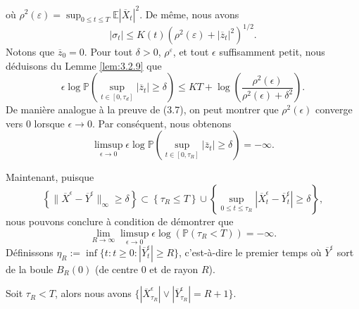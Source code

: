 \documentclass[12pt,a4paper,twoside]{report}%
\theoremstyle{definition}
\numberwithin{equation}{section}
\begin{document}
où \(\rho^{2}(\varepsilon) = \sup_{0 \leq t \leq T} \mathbb{E}|\overline{X}_t|^2\). De même, nous avons
\[
|\sigma_t| \leq K(t) \left( \rho^2(\varepsilon) + |\overline{z}_t|^2 \right)^{1/2}.
\] 	
Notons que \(\overline{z}_0 = 0\). Pour tout \(\delta > 0\), \(\rho^\varepsilon\), et tout \(\epsilon\) suffisamment petit, nous déduisons du Lemme \ref{lem:3.2.9} que
\[
\epsilon \log \mathbb{P}\left( \sup_{t \in [0, \tau_d]} |\overline{z}_t| \geq \delta \right)
\leq KT + \log\left( \frac{\rho^2(\epsilon)}{\rho^2(\epsilon) + \delta^2} \right).
\]	 	
De manière analogue à la preuve de (3.7), on peut montrer que \(\rho^2(\epsilon)\) converge vers \(0\) lorsque \(\epsilon \to 0\). Par conséquent, nous obtenons
\begin{equation}\label{eq:3.2.13}
	\limsup_{\epsilon \to 0} \epsilon \log \mathbb{P}\left( \sup_{t \in [0, \tau_R]} |\overline{z}_t| \geq \delta \right) = -\infty.
\end{equation}	 	

Maintenant, puisque
\[
\left\{ \|\overline{X}^\epsilon - \overline{Y}^\epsilon\|_\infty \geq \delta \right\}
\subset \left\{ \tau_R \leq T \right\} \cup \left\{ \sup_{0 \leq t \leq \tau_R} |\overline{X}^\epsilon_t - \overline{Y}^\epsilon_t| \geq \delta \right\},
\]
nous pouvons conclure à condition de démontrer que
\[
\lim_{R \to \infty} \limsup_{\epsilon \to 0} \epsilon \log \left( \mathbb{P}(\tau_R < T) \right) = -\infty.
\]
Définissons \(\eta_R := \inf \{t: t \geq 0 : |\overline{Y}^\epsilon_t| \geq R \}\), c'est-à-dire le premier temps où \(\overline{Y}^\epsilon\) sort de la boule \(B_R(0)\) (de centre 0 et de rayon \(R\)).

Soit \(\tau_R < T\), alors nous avons \(\{ |\overline{X}^\epsilon_{\tau_R}| \vee |\overline{Y}^\epsilon_{\tau_R}| = R+1 \}\).
\end{document}
